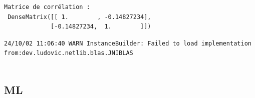 \documentclass[
  letterpaper,
  DIV=11,
  numbers=noendperiod]{scrartcl}
\begin{document}
\begin{verbatim}
Matrice de corrélation :
 DenseMatrix([[ 1.        , -0.14827234],
             [-0.14827234,  1.        ]])
\end{verbatim}

\begin{verbatim}
24/10/02 11:06:40 WARN InstanceBuilder: Failed to load implementation from:dev.ludovic.netlib.blas.JNIBLAS
                                                                                
\end{verbatim}

\subsection{ML}\label{ml}
\end{document}
